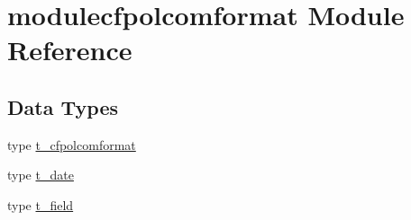 \hypertarget{namespacemodulecfpolcomformat}{}\section{modulecfpolcomformat Module Reference}
\label{namespacemodulecfpolcomformat}
\subsection*{Data Types}
\begin{DoxyCompactItemize}
\item 
type \mbox{\hyperlink{structmodulecfpolcomformat_1_1t__cfpolcomformat}{t\+\_\+cfpolcomformat}}
\item 
type \mbox{\hyperlink{structmodulecfpolcomformat_1_1t__date}{t\+\_\+date}}
\item 
type \mbox{\hyperlink{structmodulecfpolcomformat_1_1t__field}{t\+\_\+field}}
\end{DoxyCompactItemize}
